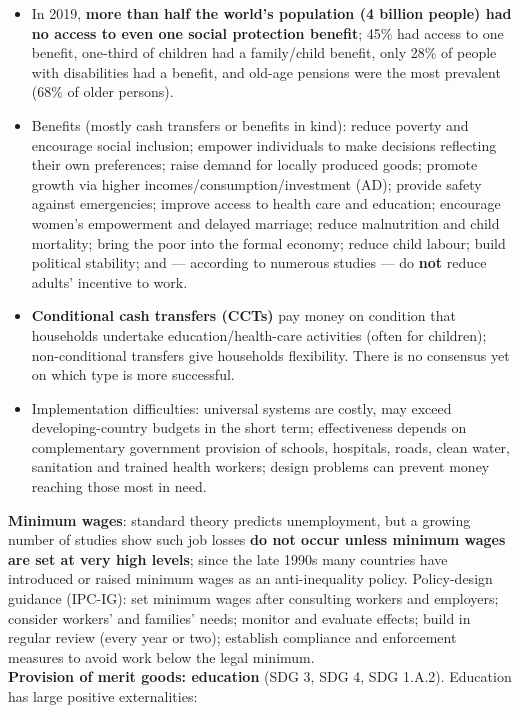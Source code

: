 \documentclass[a4paper,12pt]{article}
\begin{document}
\begin{itemize}
  \item In 2019, \textbf{more than half the world's population (4 billion people) had no access to even one social protection benefit}; 45\% had access to one benefit, one-third of children had a family/child benefit, only 28\% of people with disabilities had a benefit, and old-age pensions were the most prevalent (68\% of older persons).
  \item Benefits (mostly cash transfers or benefits in kind): reduce poverty and encourage social inclusion; empower individuals to make decisions reflecting their own preferences; raise demand for locally produced goods; promote growth via higher incomes/consumption/investment (AD); provide safety against emergencies; improve access to health care and education; encourage women's empowerment and delayed marriage; reduce malnutrition and child mortality; bring the poor into the formal economy; reduce child labour; build political stability; and --- according to numerous studies --- do \textbf{not} reduce adults' incentive to work.
  \item \textbf{Conditional cash transfers (CCTs)} pay money on condition that households undertake education/health-care activities (often for children); non-conditional transfers give households flexibility. There is no consensus yet on which type is more successful.
  \item Implementation difficulties: universal systems are costly, may exceed developing-country budgets in the short term; effectiveness depends on complementary government provision of schools, hospitals, roads, clean water, sanitation and trained health workers; design problems can prevent money reaching those most in need.
\end{itemize}
\textbf{Minimum wages}: standard theory predicts unemployment, but a growing number of studies show such job losses \textbf{do not occur unless minimum wages are set at very high levels}; since the late 1990s many countries have introduced or raised minimum wages as an anti-inequality policy. Policy-design guidance (IPC-IG): set minimum wages after consulting workers and employers; consider workers' and families' needs; monitor and evaluate effects; build in regular review (every year or two); establish compliance and enforcement measures to avoid work below the legal minimum.
\\
\textbf{Provision of merit goods: education} (SDG 3, SDG 4, SDG 1.A.2). Education has large positive externalities:
\end{document}
